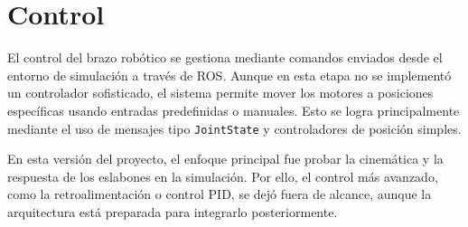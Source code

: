 \section{Control} \label{sec:control}

El control del brazo robótico se gestiona mediante comandos enviados desde el entorno de simulación a través de ROS. Aunque en esta etapa no se implementó un controlador sofisticado, el sistema permite mover los motores a posiciones específicas usando entradas predefinidas o manuales. Esto se logra principalmente mediante el uso de mensajes tipo \texttt{JointState} y controladores de posición simples.

En esta versión del proyecto, el enfoque principal fue probar la cinemática y la respuesta de los eslabones en la simulación. Por ello, el control más avanzado, como la retroalimentación o control PID, se dejó fuera de alcance, aunque la arquitectura está preparada para integrarlo posteriormente.
